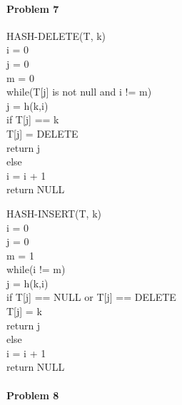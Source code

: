 \documentclass[11pt]{article}
\begin{document}
\paragraph{\noindent\textbf{\LARGE{Problem 7}}}
\begin{flushleft}
HASH-DELETE(T, k) \\
    \quad i = 0 \\
    \quad j = 0 \\
    \quad m = 0 \\
    \quad while(T[j] is not null and i != m) \\
    \quad \quad j = h(k,i) \\
    \quad \quad if T[j] == k \\
    \quad \quad \quad T[j] = DELETE \\
    \quad \quad \quad return j \\
    \quad \quad else \\
    \quad \quad \quad i = i + 1
    \quad \\
    \quad return NULL
\end{flushleft}
\begin{flushleft}
HASH-INSERT(T, k) \\
    \quad i = 0 \\
    \quad j = 0 \\
    \quad m = 1 \\
    \quad while(i != m) \\
    \quad \quad j = h(k,i) \\
    \quad \quad if T[j] == NULL or T[j] == DELETE \\
    \quad \quad \quad T[j] = k \\
    \quad \quad \quad return j \\
    \quad \quad else \\
    \quad \quad \quad i = i + 1
    \quad \\
    \quad return NULL
\end{flushleft}
\paragraph{\noindent\textbf{\LARGE{Problem 8}}}
\end{document}
